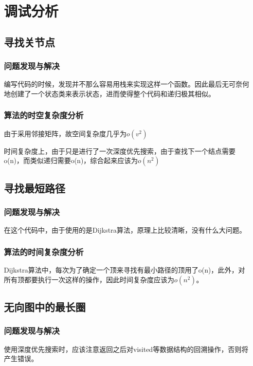 \documentclass[UTF8]{article}
\begin{document}
	
	\section{调试分析}
	\subsection{寻找关节点}
	\subsubsection{问题发现与解决}\par
	编写代码的时候，发现并不那么容易用栈来实现这样一个函数。因此最后无可奈何地创建了一个状态类来表示状态，进而使得整个代码和递归极其相似。\par
	\subsubsection{算法的时空复杂度分析}\par
	由于采用邻接矩阵，故空间复杂度几乎为$o(v^{2})$\par
	时间复杂度上，由于只是进行了一次深度优先搜索，由于查找下一个结点需要o(n)，而类似递归需要o(n)，综合起来应该为$o(n^{2})$\par
	
	\subsection{寻找最短路径}
	\subsubsection{问题发现与解决}
	在这个代码中，由于使用的是Dijkstra算法，原理上比较清晰，没有什么大问题。\par
	\subsubsection{算法的时间复杂度分析}\par
	Dijkstra算法中，每次为了确定一个顶来寻找有最小路径的顶用了o(n)，此外，对所有顶都要执行一次这样的操作，因此时间复杂度应该为$o(n^{2})$。\par
	
	\subsection{无向图中的最长圈}
	\subsubsection{问题发现与解决}\par
	使用深度优先搜索时，应该注意返回之后对visited等数据结构的回溯操作，否则将产生错误。\par
\end{document}
